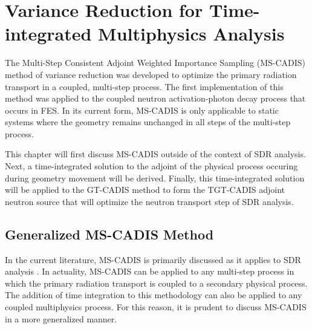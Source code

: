 \chapter{Variance Reduction for Time-integrated Multiphysics Analysis}\label{ch:ti}

The Multi-Step Consistent Adjoint Weighted Importance Sampling (MS-CADIS)
method of variance reduction 
was developed to optimize the primary radiation transport
in a coupled, multi-step process. The first implementation of this method 
was applied to the coupled neutron activation-photon decay process that occurs
in FES.  
In its current form, MS-CADIS is only applicable to static systems where
the geometry remains unchanged in all steps of the multi-step process.

This chapter will first discuss MS-CADIS outside of the context of SDR analysis. 
Next, a time-integrated solution to the adjoint of the 
physical process occuring during geometry movement will be derived.  
Finally, this time-integrated solution will be applied to the GT-CADIS method to
form the TGT-CADIS adjoint neutron source that will optimize the neutron
transport step of SDR analysis.

\section{Generalized MS-CADIS Method}
In the current literature, MS-CADIS is primarily discussed as it applies to SDR
analysis \cite{mscadis}.  In actuality, MS-CADIS can be applied to any multi-step process in
which the primary radiation transport is coupled to a secondary physical process.
The addition of time integration to this methodology can also be applied to
any coupled multiphysics process. For this reason, it is prudent to discuss
MS-CADIS in a more generalized manner.

